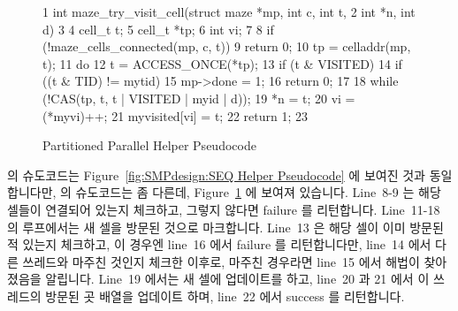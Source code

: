 \begin{figure}[tbp]
{ \scriptsize
\begin{verbbox}
  1 int maze_try_visit_cell(struct maze *mp, int c, int t,
  2       int *n, int d)
  3 {
  4   cell_t t;
  5   cell_t *tp;
  6   int vi;
  7 
  8   if (!maze_cells_connected(mp, c, t))
  9     return 0;
 10   tp = celladdr(mp, t);
 11   do {
 12     t = ACCESS_ONCE(*tp);
 13     if (t & VISITED) {
 14       if ((t & TID) != mytid)
 15         mp->done = 1;
 16       return 0;
 17     }
 18   } while (!CAS(tp, t, t | VISITED | myid | d));
 19   *n = t;
 20   vi = (*myvi)++;
 21   myvisited[vi] = t;
 22   return 1;
 23 }
\end{verbbox}
}
\centering
\theverbbox
\caption{Partitioned Parallel Helper Pseudocode}
\label{fig:SMPdesign:Partitioned Parallel Helper Pseudocode}
\end{figure}

 의 슈도코드는
Figure~\ref{fig:SMPdesign:SEQ Helper Pseudocode} 에 보여진 것과 동일합니다만,
 의 슈도코드는 좀 다른데,
Figure~\ref{fig:SMPdesign:Partitioned Parallel Helper Pseudocode} 에 보여져
있습니다.
Line~8-9 는 해당 셀들이 연결되어 있는지 체크하고, 그렇지 않다면 failure 를
리턴합니다.
Line~11-18 의 루프에서는 새 셀을 방문된 것으로 마크합니다.
Line~13 은 해당 셀이 이미 방문된 적 있는지 체크하고, 이 경우엔 line~16 에서
failure 를 리턴합니다만, line~14 에서 다른 쓰레드와 마주친 것인지 체크한
이후로, 마주친 경우라면 line~15 에서 해법이 찾아졌음을 알립니다.
Line~19 에서는 새 셀에 업데이트를 하고, line~20 과 21 에서 이 쓰레드의 방문된
곳 배열을 업데이트 하며, line~22 에서 success 를 리턴합니다.

